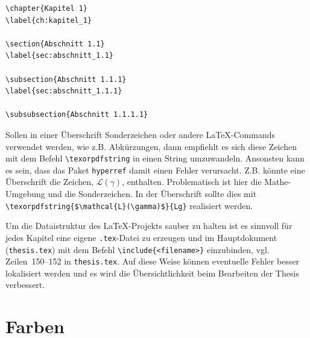 \begin{lstlisting}[float=ht,keywordsprefix={\\},keywordstyle=\color{kwcolor}\bfseries,language={[LaTeX]TeX}, caption={Kapitel und Abschnitte},label={alg:chapsNsecs}]
\chapter{Kapitel 1}
\label{ch:kapitel_1}

\section{Abschnitt 1.1}
\label{sec:abschnitt_1.1}

\subsection{Abschnitt 1.1.1}
\label{sec:abschnitt_1.1.1}

\subsubsection{Abschnitt 1.1.1.1}
\end{lstlisting}

Sollen in einer Überschrift Sonderzeichen oder andere \LaTeX{}-Commands verwendet werden, wie z.B. Abkürzungen, dann empfiehlt es sich diese Zeichen mit dem Befehl  \texttt{\textbackslash{}texorpdfstring} in einen String umzuwandeln.
Ansonsten kann es sein, dass das Paket \texttt{hyperref} damit einen Fehler verursacht.
Z.B. könnte eine Überschrift die Zeichen, $\mathcal{L}(\gamma)$, enthalten.
Problematisch ist hier die Mathe-Umgebung und die Sonderzeichen.
In der Überschrift sollte dies mit \texttt{\textbackslash{}texorpdfstring\{\$\textbackslash{}mathcal\{L\}(\textbackslash{}gamma)\$\}\{Lg\}} realisiert werden.

Um die Dataistruktur des \LaTeX-Projekts sauber zu halten ist es sinnvoll für jedes Kapitel eine eigene \texttt{.tex}-Datei zu erzeugen und im Hauptdokument (\texttt{thesis.tex}) mit dem Befehl \texttt{\textbackslash{}include\{<filename>\}} einzubinden, vgl. Zeilen~150--152 in \texttt{thesis.tex}.
Auf diese Weise können eventuelle Fehler besser lokalisiert werden und es wird die Übersichtlichkeit beim Bearbeiten der Thesis verbessert.

\section{Farben}

